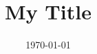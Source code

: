 \documentclass[11pt]{article}
\newcommand{\myname}{Lev Stambler}
\begin{document}
\title{My Title}


\date{\today}
\maketitle

\begin{abstract}
\end{abstract}



\end{document}
